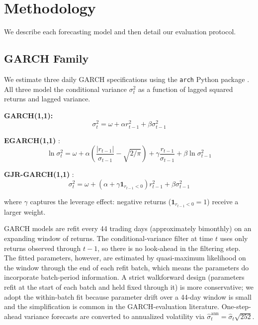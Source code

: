 \section{Methodology}\label{sec:methodology}

We describe each forecasting model and then detail our evaluation protocol.

\subsection{GARCH Family}

We estimate three daily GARCH specifications using the \texttt{arch} Python package \citep{Sheppard2023}. All three model the conditional variance $\sigma_t^2$ as a function of lagged squared returns and lagged variance.

\textbf{GARCH(1,1):}
\begin{equation}
    \sigma_t^2 = \omega + \alpha r_{t-1}^2 + \beta \sigma_{t-1}^2
\end{equation}

\textbf{EGARCH(1,1)} \citep{Nelson1991}:
\begin{equation}
    \ln \sigma_t^2 = \omega + \alpha \left(\frac{|r_{t-1}|}{\sigma_{t-1}} - \sqrt{2/\pi}\right) + \gamma \frac{r_{t-1}}{\sigma_{t-1}} + \beta \ln \sigma_{t-1}^2
\end{equation}

\textbf{GJR-GARCH(1,1)} \citep{Glosten1993}:
\begin{equation}
    \sigma_t^2 = \omega + (\alpha + \gamma \mathbf{1}_{r_{t-1}<0}) r_{t-1}^2 + \beta \sigma_{t-1}^2
\end{equation}

where $\gamma$ captures the leverage effect: negative returns ($\mathbf{1}_{r_{t-1}<0} = 1$) receive a larger weight.

GARCH models are refit every 44 trading days (approximately bimonthly) on an expanding window of returns. The conditional-variance filter at time $t$ uses only returns observed through $t-1$, so there is no look-ahead in the filtering step. The fitted parameters, however, are estimated by quasi-maximum likelihood on the window through the end of each refit batch, which means the parameters do incorporate batch-period information. A strict walkforward design (parameters refit at the start of each batch and held fixed through it) is more conservative; we adopt the within-batch fit because parameter drift over a 44-day window is small and the simplification is common in the GARCH-evaluation literature. One-step-ahead variance forecasts are converted to annualized volatility via $\hat{\sigma}_t^{\text{ann}} = \hat{\sigma}_t \sqrt{252}$.


